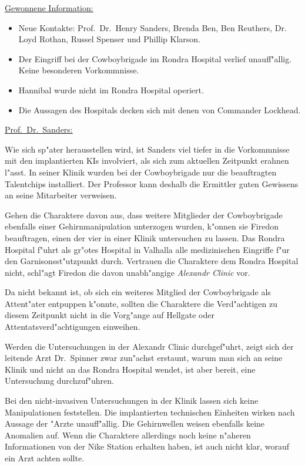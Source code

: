 \begin{remarks}
	\underline{Gewonnene Information:}
	
	\begin{itemize}
		\item Neue Kontakte: Prof.~Dr.~Henry Sanders, Brenda Ben, Ben Reuthers, Dr. Loyd Rothan, Russel Spenser und Phillip Klarson. 
		\item Der Eingriff bei der Cowboybrigade im Rondra Hospital verlief unauff"allig. Keine besonderen Vorkommnisse.
		\item Hannibal wurde nicht im Rondra Hospital operiert.
		\item Die Aussagen des Hospitals decken sich mit denen von Commander Lockhead. 
	\end{itemize}

	\underline{Prof.~Dr.~Sanders:}

	Wie sich sp"ater herausstellen wird, ist Sanders viel tiefer in die Vorkommnisse mit den implantierten KIs involviert, als sich zum aktuellen Zeitpunkt erahnen l"asst. In seiner Klinik wurden bei der Cowboybrigade nur die beauftragten Talentchips installiert. Der Professor kann deshalb die Ermittler guten Gewissens an seine Mitarbeiter verweisen.
\end{remarks}


Gehen die Charaktere davon aus, dass weitere Mitglieder der Cowboybrigade ebenfalls einer Gehirnmanipulation unterzogen wurden, k"onnen sie Firedon beauftragen, einen der vier in einer Klinik untersuchen zu lassen. Das Rondra Hospital f"uhrt als gr"o\3tes Hospital in Valhalla alle medizinischen Eingriffe f"ur den Garnisonsst"utzpunkt durch. Vertrauen die Charaktere dem Rondra Hospital nicht, schl"agt Firedon die davon unabh"angige \emph{Alexandr Clinic} vor.

Da nicht bekannt ist, ob sich ein weiteres Mitglied der Cowboybrigade als Attent"ater entpuppen k"onnte, sollten die Charaktere die Verd"achtigen zu diesem Zeitpunkt nicht in die Vorg"ange auf Hellgate oder Attentatsverd"achtigungen einweihen.

Werden die Untersuchungen in der Alexandr Clinic durchgef"uhrt, zeigt sich der leitende Arzt Dr.~Spinner zwar zun"achst erstaunt, warum man sich an seine Klinik und nicht an das Rondra Hospital wendet, ist aber bereit, eine Untersuchung durchzuf"uhren.

Bei den nicht-invasiven Untersuchungen in der Klinik lassen sich keine Manipulationen feststellen. Die implantierten technischen Einheiten wirken nach Aussage der "Arzte unauff"allig. Die Gehirnwellen weisen ebenfalls keine Anomalien auf. Wenn die Charaktere allerdings noch keine n"aheren Informationen von der Nike Station erhalten haben, ist auch nicht klar, worauf ein Arzt achten sollte.

